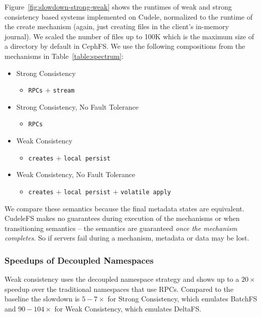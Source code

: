 Figure~\ref{fig:slowdown-strong-weak} shows the runtimes of weak and
strong consistency based systems implemented on Cudele, normalized to the
runtime of the create mechanism (again, just creating files in the client's
in-memory journal). We scaled the number of files up to 100K which is the
maximum size of a directory by default in CephFS. We use the following
compositions from the mechanisms in Table~\ref{table:spectrum}: 

\begin{itemize}
  \item Strong Consistency
  \begin{itemize}
    \item[]  \texttt{RPCs} \(+\) \texttt{stream}
  \end{itemize}
  \item Strong Consistency, No Fault Tolerance
  \begin{itemize}
    \item[] \texttt{RPCs}
  \end{itemize}
  \item Weak Consistency
  \begin{itemize}
    \item[] \texttt{creates} \(+\) \texttt{local persist}
  \end{itemize}
  \item Weak Consistency, No Fault Tolerance
  \begin{itemize}
    \item[] \texttt{creates} \(+\) \texttt{local persist} \(+\) \texttt{volatile apply}
  \end{itemize}
\end{itemize}

We compare these semantics because the final metadata states are equivalent.
CudeleFS makes no guarantees during execution of the mechanisms or when
transitioning semantics -- the semantics are guaranteed {\it once the mechanism
completes}. So if servers fail during a mechanism, metadata or data may be
lost.

\subsubsection{Speedups of Decoupled Namespaces} Weak consistency uses the
decoupled namespace strategy and shows up to a \(20\times\) speedup over the
traditional namespaces that use RPCs. Compared to the baseline the slowdown is
\(5-7\times\) for Strong Consistency, which emulates BatchFS and
\(90-104\times\) for Weak Consistency, which emulates DeltaFS.

